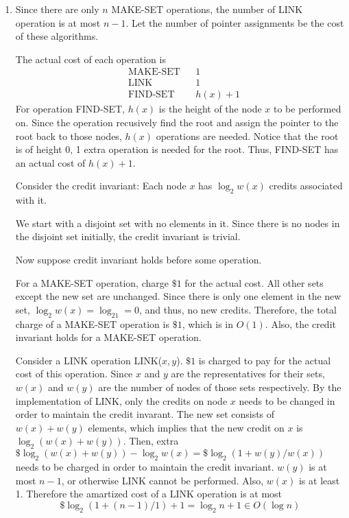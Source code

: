 \documentclass[10pt]{article}
\begin{document}
\begin{enumerate}
\begin{comment}
	Consider the following credit invariant: 
		Each node $x$ has $\log_2(w(x))$ credits associated with it. 
	\end{comment}
	\item
		Since there are only $n$ MAKE-SET operations, the number of LINK
		operation is at most $n-1$.
		Let the number of pointer assignments be the cost of these algorithms. 
		
		The actual cost of each operation is 
		\begin{align*}
			&\text{MAKE-SET}	&&  1 \\
			&\text{LINK}		&&  1 \\
			&\text{FIND-SET}	&&  h(x)+1
		\end{align*}
		For operation FIND-SET, $h(x)$ is the height of the node $x$ to be
		performed on.
		Since the operation recusively find the root and assign the pointer to
		the root back to those nodes, $h(x)$ operations are needed.
		Notice that the root is of height 0, 1 extra operation is needed for the
		root.
		Thus, FIND-SET has an actual cost of $h(x)+1$.

		Consider the credit invariant: Each node $x$ has $\log_2w(x)$ credits
		associated with it.

		We start with a disjoint set with no elements in it.
		Since there is no nodes in the disjoint set initially, the credit
		invariant is trivial.


		Now suppose credit invariant holds before some operation.

		For a MAKE-SET operation, charge $\$1$ for the actual cost.
		All other sets except the new set are unchanged.
		Since there is only one element in the new set, $\log_2w(x) = \log_21 =
		0$, and thus, no new credits.
		Therefore, the total charge of a MAKE-SET operation is $\$1$, which is
		in $O(1)$.
		Also, the credit invariant holds for a MAKE-SET operation.


		Consider a LINK operation LINK($x, y$).
		$\$1$ is charged to pay for the actual cost of this operation.
		Since $x$ and $y$ are the representatives for their sets, $w(x)$ and
		$w(y)$ are the number of nodes of those sets respectively. 
		By the implementation of LINK, only the credits on node $x$ needs to be
		changed in order to maintain the credit invarant.
		The new set consists of $w(x)+w(y)$ elements, which implies that the
		new credit on $x$ is $\log_2(w(x)+w(y))$.
		Then, extra $\$\log_2(w(x)+w(y)) - \log_2w(x) = \$\log_2(1+w(y)/w(x))$
		needs to be charged in order to maintain the credit invariant. 
		$w(y)$ is at most $n-1$, or otherwise LINK cannot be performed.
		Also, $w(x)$ is at least 1.
		Therefore the amartized cost of a LINK operation is at most
		$$\$\log_2(1+(n-1)/1)+1 = \log_2n+1 \in O(\log n)$$



\end{enumerate}
\end{document}
